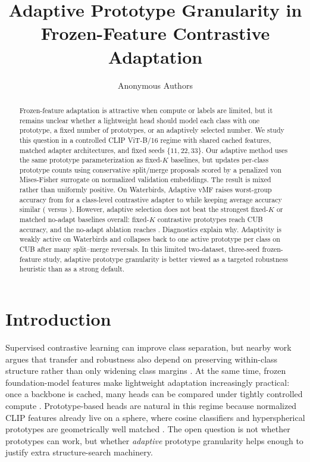 \documentclass[10pt,twocolumn]{article}
\title{Adaptive Prototype Granularity in Frozen-Feature Contrastive Adaptation}
\author{Anonymous Authors}
\date{}
\newcommand{\method}{Adaptive vMF\xspace}
\begin{document}
\maketitle

\begin{abstract}
Frozen-feature adaptation is attractive when compute or labels are limited, but it remains unclear whether a lightweight head should model each class with one prototype, a fixed number of prototypes, or an adaptively selected number. We study this question in a controlled CLIP ViT-B/16 regime with shared cached features, matched adapter architectures, and fixed seeds $\{11,22,33\}$. Our adaptive method uses the same prototype parameterization as fixed-$K$ baselines, but updates per-class prototype counts using conservative split/merge proposals scored by a penalized von Mises-Fisher surrogate on normalized validation embeddings. The result is mixed rather than uniformly positive. On Waterbirds, \method raises worst-group accuracy from \WbContrastiveWorst{} for a class-level contrastive adapter to \WbAdaptiveWorst{} while keeping average accuracy similar (\WbContrastiveAcc{} versus \WbAdaptiveAcc{}). However, adaptive selection does not beat the strongest fixed-$K$ or matched no-adapt baselines overall: fixed-$K$ contrastive prototypes reach \CubFixedKAcc{} CUB accuracy, and the no-adapt ablation reaches \CubNoAdaptAcc{}. Diagnostics explain why. Adaptivity is weakly active on Waterbirds and collapses back to one active prototype per class on CUB after many split--merge reversals. In this limited two-dataset, three-seed frozen-feature study, adaptive prototype granularity is better viewed as a targeted robustness heuristic than as a strong default.
\end{abstract}

\section{Introduction}
Supervised contrastive learning can improve class separation, but nearby work argues that transfer and robustness also depend on preserving within-class structure rather than only widening class margins \citep{khosla2020Supervised,ji2023The,chen2022Perfectly}. At the same time, frozen foundation-model features make lightweight adaptation increasingly practical: once a backbone is cached, many heads can be compared under tightly controlled compute \citep{radford2021Learning,zhang2022Contrastive}. Prototype-based heads are natural in this regime because normalized CLIP features already live on a sphere, where cosine classifiers and hyperspherical prototypes are geometrically well matched \citep{mettes2019Hyperspherical,wang2022Towards,snell2017Prototypical}. The open question is not whether prototypes can work, but whether \emph{adaptive} prototype granularity helps enough to justify extra structure-search machinery.
\end{document}
